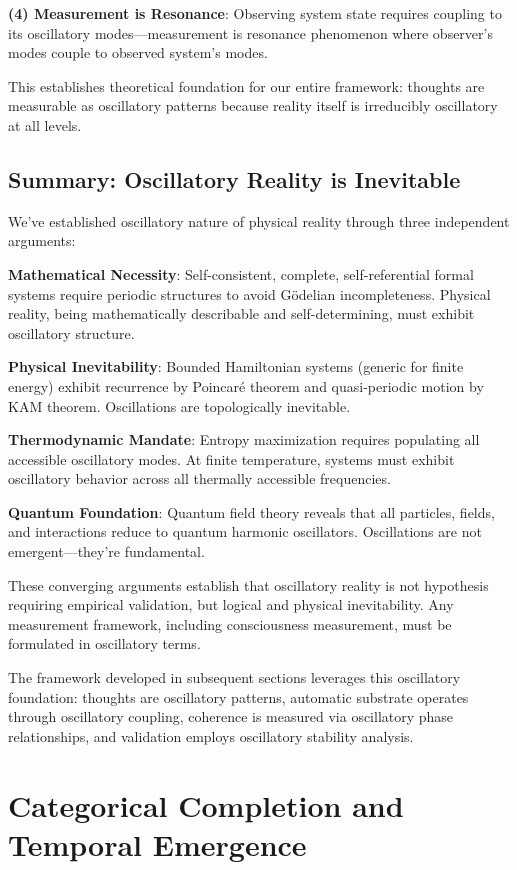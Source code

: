 \documentclass[11pt,onecolumn]{article}
\begin{document}
\textbf{(4) Measurement is Resonance}: Observing system state requires coupling to its oscillatory modes---measurement is resonance phenomenon where observer's modes couple to observed system's modes.

This establishes theoretical foundation for our entire framework: thoughts are measurable as oscillatory patterns because reality itself is irreducibly oscillatory at all levels.

\subsection{Summary: Oscillatory Reality is Inevitable}

We've established oscillatory nature of physical reality through three independent arguments:

\textbf{Mathematical Necessity}: Self-consistent, complete, self-referential formal systems require periodic structures to avoid G\"odelian incompleteness. Physical reality, being mathematically describable and self-determining, must exhibit oscillatory structure.

\textbf{Physical Inevitability}: Bounded Hamiltonian systems (generic for finite energy) exhibit recurrence by Poincar\'e theorem and quasi-periodic motion by KAM theorem. Oscillations are topologically inevitable.

\textbf{Thermodynamic Mandate}: Entropy maximization requires populating all accessible oscillatory modes. At finite temperature, systems must exhibit oscillatory behavior across all thermally accessible frequencies.

\textbf{Quantum Foundation}: Quantum field theory reveals that all particles, fields, and interactions reduce to quantum harmonic oscillators. Oscillations are not emergent---they're fundamental.

These converging arguments establish that oscillatory reality is not hypothesis requiring empirical validation, but logical and physical inevitability. Any measurement framework, including consciousness measurement, must be formulated in oscillatory terms.

The framework developed in subsequent sections leverages this oscillatory foundation: thoughts are oscillatory patterns, automatic substrate operates through oscillatory coupling, coherence is measured via oscillatory phase relationships, and validation employs oscillatory stability analysis.

\clearpage

\section{Categorical Completion and Temporal Emergence}
\end{document}
